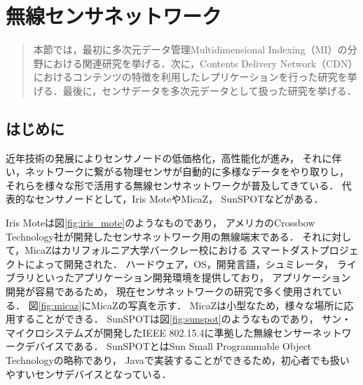 \chapter{無線センサネットワーク}
\begin{large}
\begin{quote}
本節では，最初に多次元データ管理Multidimensional Indexing（MI）の分野における関連研究を挙げる．次に，Contents Delivery Network（CDN）におけるコンテンツの特徴を利用したレプリケーションを行った研究を挙げる．最後に，センサデータを多次元データとして扱った研究を挙げる．
\end{quote}
\end{large}
\clearpage

\section{はじめに}
近年技術の発展によりセンサノードの低価格化，高性能化が進み，
それに伴い，ネットワークに繋がる物理センサが自動的に多様なデータをやり取りし，
それらを様々な形で活用する無線センサネットワークが普及してきている．
代表的なセンサノードとして，Iris MoteやMicaZ\cite{Hill:2002:MWP:623308.624560}，
SunSPOTなどがある．

Iris Moteは図\ref{fig:iris_mote}のようなものであり，
アメリカのCrossbow Technology社が開発したセンサネットワーク用の無線端末である．
それに対して，MicaZはカリフォルニア大学バークレー校における
スマートダストプロジェクト\cite{Kahn:1999:NCC:313451.313558}によって開発された．
ハードウェア，OS，開発言語，シュミレータ，
ライブラリといったアプリケーション開発環境を提供しており，
アプリケーション開発が容易であるため，
現在センサネットワークの研究で多く使用されている．
図\ref{fig:micaz}にMicaZの写真を示す．
MicaZは小型なため，様々な場所に応用することができる．
SunSPOTは図\ref{fig:sunspot}のようなものであり，
サン・マイクロシステムズが開発したIEEE 802.15.4に準拠した無線センサーネットワークデバイスである．
SunSPOTとはSun Small Programmable Object Technologyの略称であり，
Javaで実装することができるため，初心者でも扱いやすいセンサデバイスとなっている．


